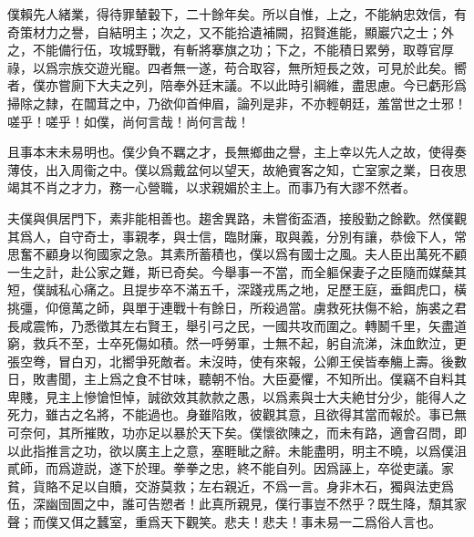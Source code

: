 僕賴先人緒業，得待罪輦轂下，二十餘年矣。所以自惟，上之，不能納忠效信，有奇策材力之譽，自結明主；次之，又不能拾遺補闕，招賢進能，顯巖穴之士；外之，不能備行伍，攻城野戰，有斬將搴旗之功；下之，不能積日累勞，取尊官厚祿，以爲宗族交遊光寵。四者無一遂，苟合取容，無所短長之效，可見於此矣。嚮者，僕亦嘗廁下大夫之列，陪奉外廷末議。不以此時引綱維，盡思慮。今已虧形爲掃除之隸，在闒茸之中，乃欲仰首伸眉，論列是非，不亦輕朝廷，羞當世之士邪！嗟乎！嗟乎！如僕，尚何言哉！尚何言哉！

且事本末未易明也。僕少負不羈之才，長無鄉曲之譽，主上幸以先人之故，使得奏薄伎，出入周衞之中。僕以爲戴盆何以望天，故絶賓客之知，亡室家之業，日夜思竭其不肖之才力，務一心營職，以求親媚於主上。而事乃有大謬不然者。

夫僕與俱居門下，素非能相善也。趨舍異路，未嘗銜盃酒，接殷勤之餘歡。然僕觀其爲人，自守奇士，事親孝，與士信，臨財廉，取與義，分別有讓，恭儉下人，常思奮不顧身以徇國家之急。其素所蓄積也，僕以爲有國士之風。夫人臣出萬死不顧一生之計，赴公家之難，斯已奇矣。今舉事一不當，而全軀保妻子之臣隨而媒蘖其短，僕誠私心痛之。且提步卒不滿五千，深踐戎馬之地，足歷王庭，垂餌虎口，橫挑彊，仰億萬之師，與單于連戰十有餘日，所殺過當。虜救死扶傷不給，旃裘之君長咸震怖，乃悉徵其左右賢王，舉引弓之民，一國共攻而圍之。轉鬭千里，矢盡道窮，救兵不至，士卒死傷如積。然一呼勞軍，士無不起，躬自流涕，沬血飲泣，更張空弮，冒白刃，北嚮爭死敵者。未沒時，使有來報，公卿王侯皆奉觴上壽。後數日，敗書聞，主上爲之食不甘味，聽朝不怡。大臣憂懼，不知所出。僕竊不自料其卑賤，見主上慘愴怛悼，誠欲效其款款之愚，以爲素與士大夫絶甘分少，能得人之死力，雖古之名將，不能過也。身雖陷敗，彼觀其意，且欲得其當而報於。事已無可奈何，其所摧敗，功亦足以暴於天下矣。僕懷欲陳之，而未有路，適會召問，即以此指推言之功，欲以廣主上之意，塞睚眦之辭。未能盡明，明主不曉，以爲僕沮貳師，而爲遊説，遂下於理。拳拳之忠，終不能自列。因爲誣上，卒從吏議。家貧，貨賂不足以自贖，交游莫救；左右親近，不爲一言。身非木石，獨與法吏爲伍，深幽囹圄之中，誰可告愬者！此真所親見，僕行事豈不然乎？既生降，頹其家聲；而僕又佴之蠶室，重爲天下觀笑。悲夫！悲夫！事未易一二爲俗人言也。

